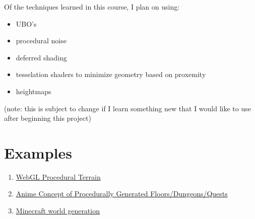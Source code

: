 \documentclass[12pt]{article}
\begin{document}
        Of the techniques learned in this course, I plan on using:
        \begin{itemize} 
            \item UBO's
            \item procedural noise
            \item deferred shading
            \item tesselation shaders to minimize geometry based on proxemity
            \item heightmaps
        \end{itemize}
        
        (note: this is subject to change if I learn something new that I would like to use after beginning this project)

\section{Examples}
\begin{enumerate}
    \item \href{https://threejs.org/examples/webgl_terrain_dynamic.html}{WebGL Procedural Terrain}
    \item \href{http://swordartonline.wikia.com/wiki/Cardinal_System}{Anime Concept of Procedurally Generated Floors/Dungeons/Quests}
    \item \href{https://www.engadget.com/2015/03/04/how-minecraft-worlds-are-made/}{Minecraft world generation}
\end{enumerate}
\end{document}
